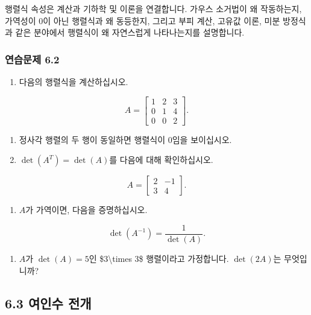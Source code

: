 \documentclass[
  12pt,
  a4paper,
]{article}
\begin{document}
행렬식 속성은 계산과 기하학 및 이론을 연결합니다. 가우스 소거법이 왜 작동하는지, 가역성이 0이 아닌 행렬식과 왜 동등한지, 그리고 부피 계산, 고유값 이론, 미분 방정식과 같은 분야에서 행렬식이 왜 자연스럽게 나타나는지를 설명합니다.

\subsubsection{연습문제 6.2}\label{exercises-62}

\begin{enumerate}
\def\labelenumi{\arabic{enumi}.}
\item
  다음의 행렬식을 계산하십시오.
\end{enumerate}

\[A = \begin{bmatrix} 1 & 2 & 3 \\ 0 & 1 & 4 \\ 0 & 0 & 2 \end{bmatrix}.\]

\begin{enumerate}
\def\labelenumi{\arabic{enumi}.}
\item
  정사각 행렬의 두 행이 동일하면 행렬식이 0임을 보이십시오.
\item
  \(\det(A^T) = \det(A)\)를 다음에 대해 확인하십시오.
\end{enumerate}

\[A = \begin{bmatrix} 2 & -1 \\ 3 & 4 \end{bmatrix}.\]

\begin{enumerate}
\def\labelenumi{\arabic{enumi}.}
\item
  \(A\)가 가역이면, 다음을 증명하십시오.
\end{enumerate}

\[\det(A^{-1}) = \frac{1}{\det(A)}.\]

\begin{enumerate}
\def\labelenumi{\arabic{enumi}.}
\item
  \(A\)가 \(\det(A) = 5\)인 \$3\textbackslash times 3\$ 행렬이라고 가정합니다. \(\det(2A)\)는 무엇입니까?
\end{enumerate}

\subsection{6.3 여인수 전개}\label{63-cofactor-expansion}
\end{document}
